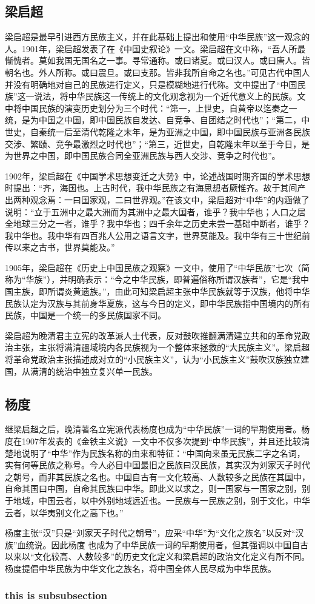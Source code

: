 \documentclass{article}
\begin{document}
\subsection{梁启超}
梁启超是最早引进西方民族主义，并在此基础上提出和使用“中华民族”这一观念的人。1901年，梁启超发表了在《中国史叙论》一文。梁启超在文中称，“吾人所最惭愧者。莫如我国无国名之一事。寻常通称。或曰诸夏。或曰汉人。或曰唐人。皆朝名也。外人所称。或曰震旦。或曰支那。皆非我所自命之名也。”可见古代中国人并没有明确地对自己的民族进行定义，只是模糊地进行代称。文中提出了“中国民族”这一说法，将中华民族这一传统上的文化观念视为一个近代意义上的民族。文中将中国民族的演变历史划分为三个时代：“第一，上世史，自黄帝以迄秦之一统，是为中国之中国，即中国民族自发达、自竞争、自团结之时代也”；“第二，中世史，自秦统一后至清代乾隆之末年，是为亚洲之中国，即中国民族与亚洲各民族交涉、繁赜、竞争最激烈之时代也”；“第三，近世史，自乾隆末年以至于今日，是为世界之中国，即中国民族合同全亚洲民族与西人交涉、竞争之时代也”。

1902年，梁启超在《中国学术思想变迁之大势》中，论述战国时期齐国的学术思想时提出：“齐，海国也。上古时代，我中华民族之有海思想者厥惟齐。故于其间产出两种观念焉：一曰国家观，二曰世界观。”在该文中，梁启超对“中华”的内涵做了说明：“立于五洲中之最大洲而为其洲中之最大国者，谁乎？我中华也；人口之居全地球三分之一者，谁乎？我中华也；四千余年之历史未尝一基础中断者，谁乎？我中华也。我中华有四百兆人公用之语言文字，世界莫能及。我中华有三十世纪前传以来之古书，世界莫能及。”

1905年，梁启超在《历史上中国民族之观察》一文中，使用了“中华民族”七次（简称为“华族”），并明确表示：“今之中华民族，即普遍俗称所谓汉族者”，它是“我中国主族，即所谓炎黄遗族。”，由此可知梁启超主张中华民族就等于汉族，他将中华民族认定为汉族与其前身华夏族，这与今日的定义，即中华民族指中国境内的所有民族，中国是一个统一的多民族国家不同。

梁启超为晚清君主立宪的改革派人士代表，反对鼓吹推翻满清建立共和的革命党政治主张，主张将满清疆域境内各民族视为一个整体来拯救的“大民族主义”。梁启超将革命党政治主张描述成对立的“小民族主义”，认为“小民族主义”鼓吹汉族独立建国，从满清的统治中独立复兴单一民族。

\subsection{杨度}
继梁启超之后，晚清著名立宪派代表杨度也成为“中华民族”一词的早期使用者。杨度在1907年发表的《金铁主义说》一文中不仅多次提到“中华民族”，并且还比较清楚地说明了“中华”作为民族名称的由来和特征：“中国向来虽无民族二字之名词，实有何等民族之称号。今人必目中国最旧之民族曰汉民族，其实汉为刘家天子时代之朝号，而非其民族之名也。中国自古有一文化较高、人数较多之民族在其国中，自命其国曰中国，自命其民族曰中华。即此义以求之，则一国家与一国家之别，别于地域，中国云者，以中外别地域远近也。一民族与一民族之别，别于文化，中华云者，以华夷别文化之高下也。”

杨度主张“汉”只是“刘家天子时代之朝号”，应采“中华”为“文化之族名”以反对“汉族”血统说。因此杨度 也成为了中华民族一词的早期使用者，但其强调以中国自古以来以“文化较高、人数较多”的历史文化定义和梁启超的政治文化定义有所不同。杨度提倡中华民族为中华文化之族名，将中国全体人民尽成为中华民族。




	\subsubsection{this is subsubsection}



{\small
	
	
}
\end{document}

